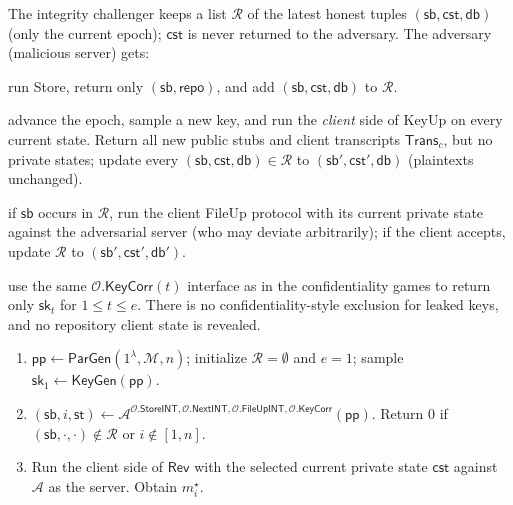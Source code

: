 \begin{definition}
\label{def:of-ptxt}
The integrity challenger keeps a list $\mathcal{R}$ of the latest honest tuples $(\mathsf{sb},\mathsf{cst},\mathsf{db})$ (only the current epoch); $\mathsf{cst}$ is never returned to the adversary.
The adversary (malicious server) gets:
\begin{description}[leftmargin=1.4em,style=nextline]
  \item[$\mathcal{O}.\mathsf{StoreINT}(\mathsf{db})$]
    run Store, return only $(\mathsf{sb},\mathsf{repo})$, and add $(\mathsf{sb},\mathsf{cst},\mathsf{db})$ to $\mathcal{R}$.
  \item[$\mathcal{O}.\mathsf{NextINT}$]
    advance the epoch, sample a new key, and run the \emph{client} side of KeyUp on every current state. Return all new public stubs and client transcripts $\mathsf{Trans}_c$, but no private states; update every $(\mathsf{sb},\mathsf{cst},\mathsf{db})\in\mathcal{R}$ to $(\mathsf{sb}',\mathsf{cst}',\mathsf{db})$ (plaintexts unchanged).
  \item[$\mathcal{O}.\mathsf{FileUpINT}(m'_i,i,\mathsf{sb})$]
    if $\mathsf{sb}$ occurs in $\mathcal{R}$, run the client FileUp protocol with its current private state against the adversarial server (who may deviate arbitrarily); if the client accepts, update $\mathcal{R}$ to $(\mathsf{sb}',\mathsf{cst}',\mathsf{db}')$.
  \item[$\mathcal{O}.\mathsf{KeyCorr}(t)$]
    use the same $\mathcal O.\mathsf{KeyCorr}(t)$ interface as in the confidentiality games to return only $\mathsf{sk}_t$ for $1\le t\le e$. There is no confidentiality-style exclusion for leaked keys, and no repository client state is revealed.
\end{description}
\par{}
\begin{enumerate}
  \item $\mathsf{pp}\gets\mathsf{ParGen}(1^\lambda,\mathcal M,n)$; initialize $\mathcal R=\emptyset$ and $e=1$; sample $\mathsf{sk}_1\gets\mathsf{KeyGen}(\mathsf{pp})$.
  \item $(\mathsf{sb},i,\mathsf{st})\gets\mathcal{A}^{\mathcal{O}.\mathsf{StoreINT},\mathcal{O}.\mathsf{NextINT},\mathcal{O}.\mathsf{FileUpINT},\mathcal{O}.\mathsf{KeyCorr}}(\mathsf{pp})$.
        Return $0$ if $(\mathsf{sb},\cdot,\cdot)\notin\mathcal{R}$ or $i\notin[1,n]$.
  \item Run the client side of $\mathsf{Rev}$ with the selected current private state $\mathsf{cst}$ against $\mathcal{A}$ as the server. Obtain $m_i^\star$.

\end{enumerate}
\end{definition}
